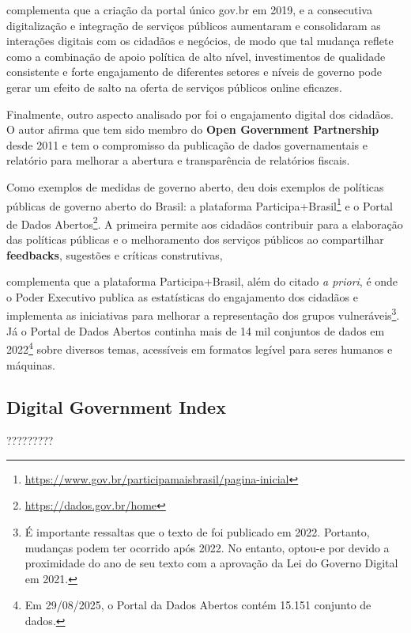 \cite{gtmi_2022_latinamerica} complementa que a criação da portal único gov.br em 2019, e a consecutiva digitalização e integração de serviços públicos aumentaram e consolidaram as interações digitais com os cidadãos e negócios, de modo que tal mudança reflete como a combinação de apoio política de alto nível, investimentos de qualidade consistente e forte engajamento de diferentes setores e níveis de governo pode gerar um efeito de salto na oferta de serviços públicos online eficazes.

Finalmente, outro aspecto analisado por \cite{gtmi_2022_latinamerica} foi o engajamento digital dos cidadãos. O autor afirma que tem sido membro do \textbf{Open Government Partnership} desde 2011 e tem o compromisso da publicação de dados governamentais e relatório para melhorar a abertura e transparência de relatórios fiscais.

Como exemplos de medidas de governo aberto, \cite{gtmi_2022_latinamerica} deu dois exemplos de políticas públicas de governo aberto do Brasil: a plataforma Participa+Brasil\footnote{\url{https://www.gov.br/participamaisbrasil/pagina-inicial}} e o Portal de Dados Abertos\footnote{\url{https://dados.gov.br/home}}. A primeira
permite aos cidadãos contribuir para a elaboração das políticas públicas e o melhoramento dos serviços públicos ao compartilhar \textbf{feedbacks}, sugestões e críticas construtivas, 

\cite{gtmi_2022_latinamerica} complementa que a plataforma Participa+Brasil, além do citado \textit{a priori}, é onde o Poder Executivo publica as estatísticas do engajamento dos cidadãos e implementa as iniciativas para melhorar a representação dos grupos vulneráveis\footnote{É importante ressaltas que o texto de \cite{gtmi_2022_latinamerica} foi publicado em 2022. Portanto, mudanças podem ter ocorrido após 2022. No entanto, optou-e por \cite{gtmi_2022_latinamerica} devido a proximidade do ano de seu texto com a aprovação da Lei do Governo Digital em 2021.}. Já o Portal de Dados Abertos continha mais de 14 mil conjuntos de dados em 2022\footnote{Em 29/08/2025, o Portal da Dados Abertos contém 15.151 conjunto de dados.} sobre diversos temas, acessíveis em formatos legível para seres humanos e máquinas. 

\subsection{Digital Government Index}

?????????

